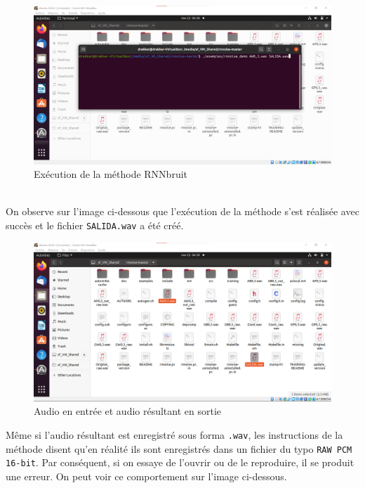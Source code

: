 \documentclass[conference,onecolumn]{IEEEtran}
\begin{document}
 \begin{figure}[H]
 \centering
    \includegraphics[scale=0.45]{VM4.png}
    \caption{Exécution de la méthode RNNbruit } 
\end{figure}
\hfill\\

On observe sur l’image ci-dessous que l’exécution de la méthode s’est réalisée avec succès et le fichier \texttt{SALIDA.wav} a été créé.
 \begin{figure}[H]
 \centering
    \includegraphics[scale=0.4]{VM5.png}
    \caption{Audio en entrée et audio résultant en sortie} 
\end{figure}

Même si l’audio résultant est enregistré sous forma \texttt{.wav}, les instructions de la méthode disent qu’en réalité ils sont enregistrés dans un fichier du typo \texttt{RAW PCM 16-bit}. Par conséquent, si on essaye de l’ouvrir ou de le reproduire, il se produit une erreur. On peut voir ce comportement sur l’image ci-dessous. 
\end{document}
